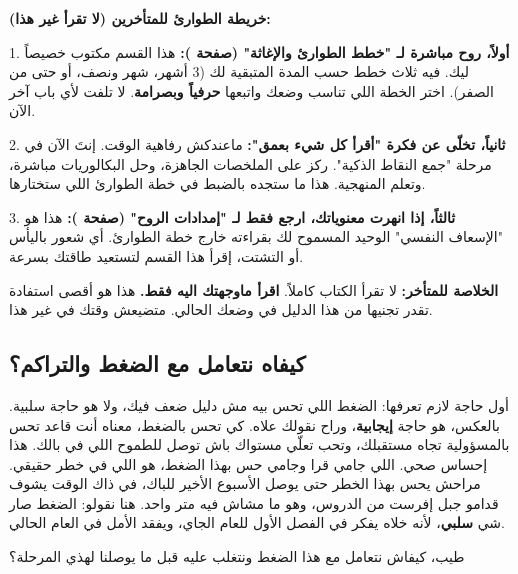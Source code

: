 \documentclass[12pt,a4paper]{book}
\begin{document}
	\textbf{خريطة الطوارئ للمتأخرين (لا تقرأ غير هذا):}
	
	1.  \textbf{أولاً، روح مباشرة لـ "خطط الطوارئ والإغاثة" (صفحة \pageref{sec:psy-late-start-success}):} هذا القسم مكتوب خصيصاً ليك. فيه ثلاث خطط حسب المدة المتبقية لك (3 أشهر، شهر ونصف، أو حتى من الصفر). اختر الخطة اللي تناسب وضعك واتبعها \textbf{حرفياً وبصرامة}. لا تلفت لأي باب آخر الآن.
	
	2.  \textbf{ثانياً، تخلّى عن فكرة "أقرأ كل شيء بعمق":} ماعندكش رفاهية الوقت. إنتَ الآن في مرحلة "جمع النقاط الذكية". ركز على الملخصات الجاهزة، وحل البكالوريات مباشرة، وتعلم المنهجية. هذا ما ستجده بالضبط في خطة الطوارئ اللي ستختارها.
	
	3.  \textbf{ثالثاً، إذا انهرت معنوياتك، ارجع فقط لـ "إمدادات الروح" (صفحة \pageref{chap:soul}):} هذا هو "الإسعاف النفسي" الوحيد المسموح لك بقراءته خارج خطة الطوارئ. أي شعور باليأس أو التشتت، إقرأ هذا القسم لتستعيد طاقتك بسرعة.
	
	\textbf{الخلاصة للمتأخر:}
	لا تقرأ الكتاب كاملاً. \textbf{اقرأ ماوجهتك اليه فقط.} هذا هو أقصى استفادة تقدر تجنيها من هذا الدليل في وضعك الحالي. متضيعش وقتك في غير هذا.
	
	
	
	\subsection*{كيفاه نتعامل مع الضغط والتراكم؟}
	\label{sec:deal-with-stress}
	
	أول حاجة لازم تعرفها: الضغط اللي تحس بيه مش دليل ضعف فيك، ولا هو حاجة سلبية. بالعكس، هو حاجة \textbf{إيجابية}، وراح نقولك علاه. كي تحس بالضغط، معناه أنت قاعد تحس بالمسؤولية تجاه مستقبلك، وتحب تعلّي مستواك باش توصل للطموح اللي في بالك. هذا إحساس صحي. اللي جامي قرا وجامي حس بهذا الضغط، هو اللي في خطر حقيقي. مراحش يحس بهذا الخطر حتى يوصل الأسبوع الأخير للباك، في ذاك الوقت يشوف قدامو جبل إفرست من الدروس، وهو ما مشاش فيه متر واحد. هنا نقولو: الضغط صار شي \textbf{سلبي}، لأنه خلاه يفكر في الفصل الأول للعام الجاي، ويفقد الأمل في العام الحالي.
	
	طيب، كيفاش نتعامل مع هذا الضغط ونتغلب عليه قبل ما يوصلنا لهذي المرحلة؟
	
\end{document}
